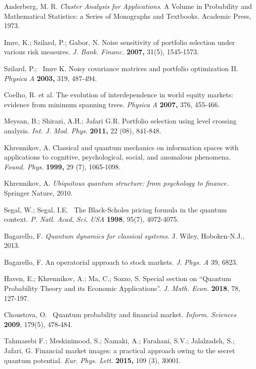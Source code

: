 \documentclass[journal,article,submit,moreauthors,pdftex]{Definitions/mdpi}
\begin{document}
\begin{thebibliography}{99}
	 Anderberg, M. R. \textit{Cluster Analysis for
		Applications}. A Volume in Probability and Mathematical Statistics: a Series
	of Monographs and Textbooks. Academic Press, 1973.
	
	 Imre, K.; Szilard, P.; Gabor, N. Noise sensitivity of
	portfolio selection under various risk measures. \textit{J. Bank. Financ. }%
	\textbf{2007, } 31(5), 1545-1573.
	
	 Szilard, P.; \ Imre K. Noisy covariance matrices and
	portfolio optimization II. \textit{Physica A} \textbf{2003, }319, 487-494.
	
	 Coelho, R. et al. The evolution of interdependence in world
	equity markets: evidence from minimum spanning trees. \textit{Physica A} 
	\textbf{2007, }376, 455-466.
	
	 Meysan, B.; Shirazi, A.H.;  Jafari G.R. Portfolio
	selection using level crossing analysis. \textit{Int. J. Mod. Phys.} \textbf{%
		2011, }22 (08), 841-848.
	
	 Khrennikov, A. Classical and quantum mechanics on
	information spaces with applications to cognitive, psychological, social,
	and anomalous phenomena. \textit{Found. Phys.} \textbf{1999, }29 (7),
	1065-1098.
	
	 Khrennikov, A. \textit{Ubiquitous quantum structure:
		from psychology to finance.} Springer Nature, 2010.
	
	 Segal, W.; Segal, I.E. \ The Black-Scholes pricing formula
	in the quantum context. \textit{P. Natl. Acad. Sci. USA} \textbf{1998},
	95(7), 4072-4075.
	
	 Bagarello, F. \textit{Quantum dynamics for classical
		systems.} J. Wiley, Hoboken-N.J., 2013.
	
	 Bagarello, F. An operatorial approach to stock
	markets. \textit{J. Phys. A} 39, 6823.
	
	 Haven, E.; Khrennikov, A.; Ma, C.; Sozzo, S. Special section
	on \textquotedblleft Quantum Probability Theory and its Economic
	Applications\textquotedblright . \textit{J. Math. Econ. }\textbf{2018}, 78,
	127-197.
	
	 Choustova, O. \ Quantum probability and financial
	market. \textit{Inform. Sciences }\textbf{2009}, 179(5), 478-484.
	
	 Tahmasebi F.; Meskinimood, S.; Namaki, A.; Farahani,
	S.V.; Jalalzadeh, S.; Jafari, G. Financial market images: a practical
	approach owing to the secret quantum potential. \textit{Eur. Phys. Lett.} 
	\textbf{2015, }109 (3), 30001.
	

\end{thebibliography}
\end{document}
